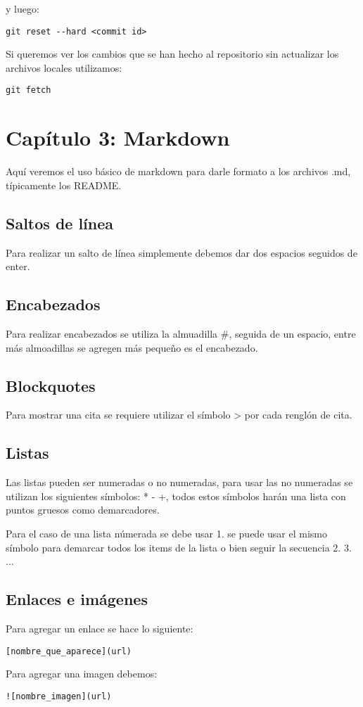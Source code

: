 y luego:
\begin{lstlisting}[numbers=none]
  git reset --hard <commit id>
\end{lstlisting}


Si queremos ver los cambios que se han hecho al repositorio sin actualizar los archivos locales utilizamos:
\begin{lstlisting}[numbers=none]
  git fetch
\end{lstlisting}

\section{Cap\'itulo 3: Markdown}
Aqu\'i veremos el uso b\'asico de markdown para darle formato a los archivos .md, t\'ipicamente los README.

\subsection{Saltos de l\'inea}
Para realizar un salto de l\'inea simplemente debemos dar dos espacios seguidos de enter.

\subsection{Encabezados}
Para realizar encabezados se utiliza la almuadilla \#, seguida de un espacio, entre m\'as almoadillas se agregen m\'as pequeño es el encabezado.

\subsection{Blockquotes}
Para mostrar una cita se requiere utilizar el s\'imbolo > por cada rengl\'on de cita.

\subsection{Listas}
Las listas pueden ser numeradas o no numeradas, para usar las no numeradas se utilizan los siguientes s\'imbolos: * - +, todos estos s\'imbolos har\'an una lista con puntos gruesos como demarcadores.

Para el caso de una lista n\'umerada se debe usar 1. se puede usar el mismo s\'imbolo para demarcar todos los items de la lista o bien seguir la secuencia 2. 3. ...

\subsection{Enlaces e im\'agenes}
Para agregar un enlace se hace lo siguiente:


\begin{lstlisting}[numbers=none]
  [nombre_que_aparece](url)
\end{lstlisting}

Para agregar una imagen debemos:


\begin{lstlisting}[numbers=none]
  ![nombre_imagen](url)
\end{lstlisting}
